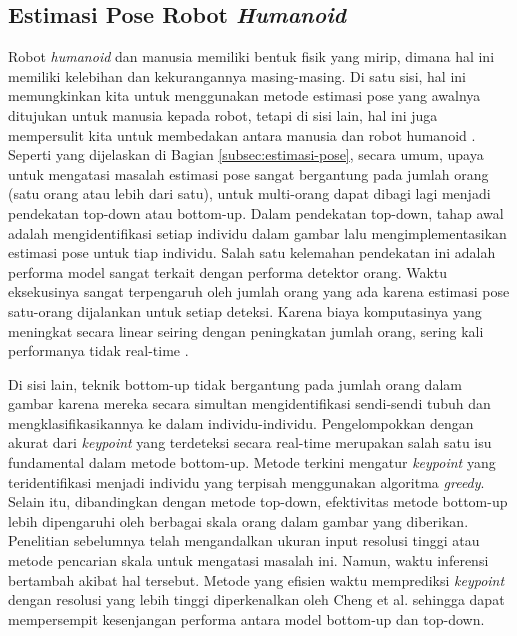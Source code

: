 \subsection{Estimasi Pose Robot \emph{Humanoid}}
\label{subsec:estimasi-pose-robot-humanoid}

Robot \emph{humanoid} dan manusia memiliki bentuk fisik yang mirip, dimana hal ini memiliki kelebihan dan kekurangannya masing-masing. Di satu sisi, hal ini memungkinkan kita untuk menggunakan metode estimasi pose yang awalnya ditujukan untuk manusia kepada robot, tetapi di sisi lain, hal ini juga mempersulit kita untuk membedakan antara manusia dan robot humanoid \parencite{amini2021}.
Seperti yang dijelaskan di Bagian \ref{subsec:estimasi-pose}, secara umum, upaya untuk mengatasi masalah estimasi pose sangat bergantung pada jumlah orang (satu orang atau lebih dari satu), untuk  multi-orang dapat dibagi lagi menjadi pendekatan top-down atau bottom-up.
Dalam pendekatan top-down, tahap awal adalah mengidentifikasi setiap individu dalam gambar lalu mengimplementasikan estimasi pose untuk tiap individu.
Salah satu kelemahan pendekatan ini adalah performa model sangat terkait dengan performa detektor orang. Waktu eksekusinya sangat terpengaruh oleh jumlah orang yang ada karena estimasi pose satu-orang dijalankan untuk setiap deteksi. Karena biaya komputasinya yang meningkat secara linear seiring dengan peningkatan jumlah orang, sering kali performanya tidak real-time \parencite{amini2021}.

Di sisi lain, teknik bottom-up tidak bergantung pada jumlah orang dalam gambar karena mereka secara simultan mengidentifikasi sendi-sendi tubuh dan mengklasifikasikannya ke dalam individu-individu. Pengelompokkan dengan akurat dari \emph{keypoint} yang terdeteksi secara real-time merupakan salah satu isu fundamental dalam metode bottom-up.
Metode terkini mengatur \emph{keypoint} yang teridentifikasi menjadi individu yang terpisah menggunakan algoritma \emph{greedy}. Selain itu, dibandingkan dengan metode top-down, efektivitas metode bottom-up lebih dipengaruhi oleh berbagai skala orang dalam gambar yang diberikan. Penelitian sebelumnya telah mengandalkan ukuran input resolusi tinggi \parencite{papandreou2018} atau metode pencarian skala \parencite{cao2019} untuk mengatasi masalah ini. Namun, waktu inferensi bertambah akibat hal tersebut.
Metode yang efisien waktu memprediksi \emph{keypoint} dengan resolusi yang lebih tinggi diperkenalkan oleh Cheng et al. \parencite{cheng2020} sehingga dapat mempersempit kesenjangan performa antara model bottom-up dan top-down.

